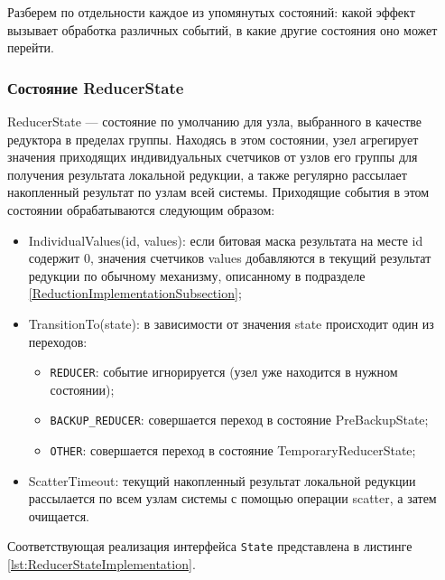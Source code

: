 \documentclass{article}
\theoremstyle{plain}
\theoremstyle{plain}
\theoremstyle{plain}
\theoremstyle{plain}
\theoremstyle{definition}
\theoremstyle{remark}
\theoremstyle{plain}
\begin{document}
Разберем по отдельности каждое из упомянутых состояний: какой эффект вызывает обработка различных событий, в какие другие состояния оно может перейти.

\subsubsection{Состояние ReducerState}

ReducerState --- состояние по умолчанию для узла, выбранного в качестве редуктора в пределах группы. Находясь в этом состоянии, узел агрегирует значения приходящих индивидуальных счетчиков от узлов его группы для получения результата локальной редукции, а также регулярно рассылает накопленный результат по узлам всей системы. Приходящие события в этом состоянии обрабатываются следующим образом:

\begin{itemize}
    \item IndividualValues(id, values): если битовая маска результата на месте id содержит $0$, значения счетчиков values добавляются в текущий результат редукции по обычному механизму, описанному в подразделе \ref{ReductionImplementationSubsection};
    
    \item TransitionTo(state): в зависимости от значения state происходит один из переходов:
        
        \begin{itemize}
            \item \texttt{REDUCER}: событие игнорируется (узел уже находится в нужном состоянии);
            \item \texttt{BACKUP\_REDUCER}: совершается переход в состояние PreBackupState;
            \item \texttt{OTHER}: совершается переход в состояние TemporaryReducerState;
        \end{itemize}
        
    \item ScatterTimeout: текущий накопленный результат локальной редукции рассылается по всем узлам системы с помощью операции scatter, а затем очищается.
\end{itemize}

Соответствующая реализация интерфейса \texttt{State} представлена в листинге \ref{lst:ReducerStateImplementation}.
\end{document}
